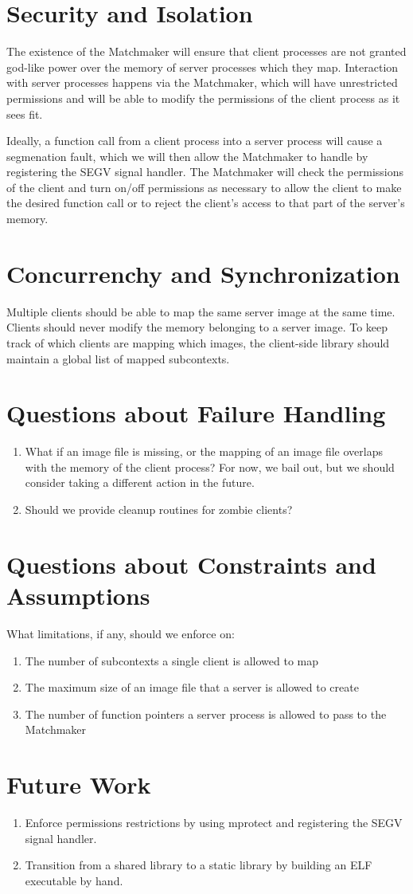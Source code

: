 \documentclass{article}
\begin{document}
\section{Security and Isolation}
The existence of the Matchmaker will ensure that client processes are not
granted god-like power over the memory of server processes which they map.
Interaction with server processes happens via the Matchmaker, which will have
unrestricted permissions and will be able to modify the permissions of the
client process as it sees fit.

Ideally, a function call from a client process into a server process will cause
a segmenation fault, which we will then allow the Matchmaker to handle by
registering the SEGV signal handler. The Matchmaker will check the permissions
of the client and turn on/off permissions as necessary to allow the client to
make the desired function call or to reject the client's access to that part of
the server's memory.

\section{Concurrenchy and Synchronization}
Multiple clients should be able to map the same server image at the same time.
Clients should never modify the memory belonging to a server image. To
keep track of which clients are mapping which images, the client-side library
should maintain a global list of mapped subcontexts.

\section{Questions about Failure Handling}
\begin{enumerate}[(1)]
    \item What if an image file is missing, or the mapping of an image file
        overlaps with the memory of the client process? For now, we bail out,
        but we should consider taking a different action in the future.
    \item Should we provide cleanup routines for zombie clients?
\end{enumerate}

\newpage
\section{Questions about Constraints and Assumptions}
What limitations, if any, should we enforce on:
\begin{enumerate}[(1)]
    \item The number of subcontexts a single client is allowed to map
    \item The maximum size of an image file that a server is allowed to create
    \item The number of function pointers a server process is allowed to pass to the Matchmaker
\end{enumerate}

\section{Future Work}
\begin{enumerate}[(1)]
    \item Enforce permissions restrictions by using mprotect and registering the SEGV
    signal handler.
    \item Transition from a shared library to a static library by building an ELF
    executable by hand.
\end{enumerate}
\end{document}
